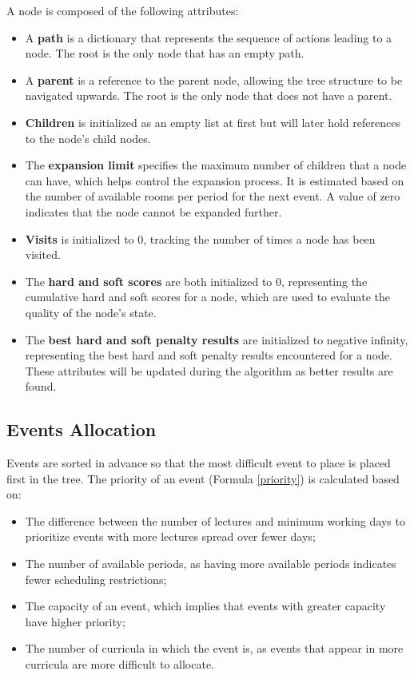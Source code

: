 A node is composed of the following attributes:

\begin{itemize}
\item A \textbf{path} is a dictionary that represents the sequence of actions leading to a node. The root is the only node that has an empty path.

\item A \textbf{parent} is a reference to the parent node, allowing the tree structure to be navigated upwards. The root is the only node that does not have a parent.

\item \textbf{Children} is initialized as an empty list at first but will later hold references to the node's child nodes. 

\item The \textbf{expansion limit} specifies the maximum number of children that a node can have, which helps control the expansion process. It is estimated based on the number of available rooms per period for the next event. A value of zero indicates that the node cannot be expanded further.

\item \textbf{Visits} is initialized to 0, tracking the number of times a node has been visited.

\item The \textbf{hard and soft scores} are both initialized to 0, representing the cumulative hard and soft scores for a node, which are used to evaluate the quality of the node's state.

\item The \textbf{best hard and soft penalty results} are initialized to negative infinity, representing the best hard and soft penalty results encountered for a node. These attributes will be updated during the algorithm as better results are found. 
\end{itemize}

\subsection{Events Allocation}

Events are sorted in advance so that the most difficult event to place is placed first in the tree. The priority of an event (Formula \ref{priority}) is calculated based on:

\begin{itemize}
\item The difference between the number of lectures and minimum working days to prioritize events with more lectures spread over fewer days;
\item The number of available periods, as having more available periods indicates fewer scheduling restrictions;
\item The capacity of an event, which implies that events with greater capacity have higher priority;
\item The number of curricula in which the event is, as events that appear in more curricula are more difficult to allocate.
\end{itemize}

